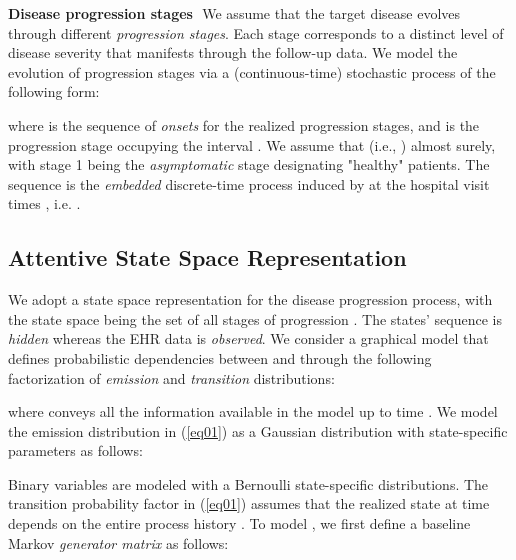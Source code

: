 \documentclass[twoside,11pt]{article}
\begin{document}
{\bf Disease progression stages}\,\, We assume that the target disease evolves through \mbox{\footnotesize } different {\it progression stages}. Each stage corresponds to a distinct level of disease severity that manifests through the follow-up data. We model the evolution of progression stages via a (continuous-time) stochastic process \mbox{\footnotesize } of the following form: 

where \mbox{\footnotesize } is the sequence of {\it onsets} for the realized progression stages, and \mbox{\footnotesize } is the progression stage occupying the interval \mbox{\footnotesize }. We assume that \mbox{\footnotesize } (i.e., \mbox{\footnotesize }) almost surely, with stage 1 being the {\it asymptomatic} stage designating "healthy" patients. The sequence \mbox{\footnotesize } is the {\it embedded} discrete-time process induced by \mbox{\footnotesize } at the hospital visit times \mbox{\footnotesize }, i.e. \mbox{\footnotesize }. 

\subsection{Attentive State Space Representation}
\label{Sec32}
We adopt a state space representation for the disease progression process, with the state space being the set of all stages of progression \mbox{\footnotesize }. The states' sequence \mbox{\footnotesize } is {\it hidden} whereas the EHR data \mbox{\footnotesize } is {\it observed}. We consider a graphical model that defines probabilistic dependencies between \mbox{\footnotesize } and \mbox{\footnotesize } through the following factorization of {\it emission} and {\it transition} distributions: 

where \mbox{\footnotesize } conveys all the information available in the model up to time \mbox{\footnotesize }. We model the emission distribution in (\ref{eq01}) as a Gaussian distribution with state-specific parameters as follows: 
 
Binary variables are modeled with a Bernoulli state-specific distributions. The transition probability factor in (\ref{eq01}) assumes that the realized state at time \mbox{\footnotesize } depends on the entire process history \mbox{\footnotesize }. To model \mbox{\footnotesize }, we first define a \mbox{\footnotesize } baseline Markov {\it generator matrix} \mbox{\footnotesize } as follows: 
\end{document}
